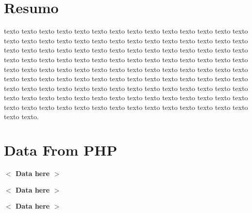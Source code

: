 \documentclass[12pt]{article}
\title{\vspace{-1in}\parbox{\linewidth}{\footnotesize\noindent{\sc \bf XI Summer Workshop in Mathematics - 2018 - Universidade de Bras\'ilia}} \break\indent{\sc T\'iltulo T\'iltulo T\'iltulo T\'iltulo}}
\date{}
\author{\sc nome   \\ {\it email}
\\
{\small Universidade de Bras\'ilia }}
\newcommand{\placeholder}[1]{\textbf{$<$ #1 $>$}}
\newcommand{\titulotrabalho}{\placeholder{Data here}}
\newcommand{\autortrabalho}{\placeholder{Data here}}
\newcommand{\abstractrabalho}{\placeholder{Data here}}
\begin{document}
\pagestyle{empty}
\maketitle

\section*{Resumo} 
texto texto texto texto texto texto texto texto texto texto texto texto texto texto texto texto texto texto
texto texto texto texto texto texto texto texto texto texto texto texto texto texto texto texto texto texto
texto texto texto texto texto texto texto texto texto texto texto texto texto texto texto texto texto texto
texto texto texto texto texto texto texto texto texto texto texto texto texto texto texto texto texto texto
texto texto texto texto texto texto texto texto texto texto texto texto texto texto texto texto texto texto
texto texto texto texto texto texto texto texto texto texto texto texto texto texto texto texto texto texto
texto texto texto texto texto texto texto texto texto texto texto texto texto texto texto texto texto texto
texto texto.

\thispagestyle{empty}

    \section{Data From PHP}
    \titulotrabalho{}

    \autortrabalho{}

    \abstractrabalho{}
\end{document}
